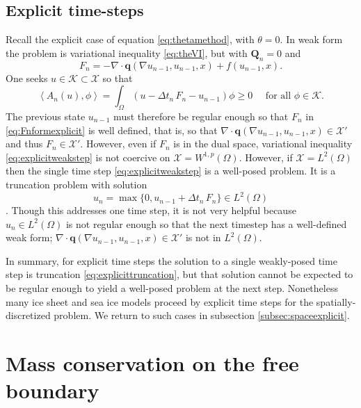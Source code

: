 \documentclass[final,onefignum]{siamart190516}
\newcommand\bq{\mathbf{q}}
\newcommand\bQ{\mathbf{Q}}
\newcommand{\Div}{\nabla\cdot}
\newcommand{\grad}{\nabla}
\newcommand{\ip}[2]{\ensuremath{\left<#1,#2\right>}}
\begin{document}
\subsection{Explicit time-steps} \label{subsec:explicit}  Recall the explicit case of equation \eqref{eq:thetamethod}, with $\theta=0$.  In weak form the problem is variational inequality \eqref{eq:theVI}, but with $\bQ_n=0$ and
\begin{equation}
F_n = - \Div \bq(\grad u_{n-1},u_{n-1},x) + f(u_{n-1},x).  \label{eq:Fnformexplicit}
\end{equation}
One seeks $u\in\mathcal{K} \subset \mathcal{X}$ so that
\begin{equation}
\ip{A_n(u)}{\phi} = \int_\Omega (u - \Delta t_n\,F_n - u_{n-1})\phi \ge 0 \quad \text{ for all } \phi \in \mathcal{K}.  \label{eq:explicitweakstep}
\end{equation}
The previous state $u_{n-1}$ must therefore be regular enough so that $F_n$ in \eqref{eq:Fnformexplicit} is well defined, that is, so that $\Div \bq(\grad u_{n-1},u_{n-1},x) \in \mathcal{X}'$ and thus $F_n\in\mathcal{X}'$.  However, even if $F_n$ is in the dual space, variational inequality \eqref{eq:explicitweakstep} is not coercive on $\mathcal{X}=W^{1,p}(\Omega)$.  However, if $\mathcal{X}=L^2(\Omega)$ then the single time step \eqref{eq:explicitweakstep} is a well-posed problem.  It is a truncation problem with solution
\begin{equation}
u_n = \max\{0,u_{n-1} + \Delta t_n\,F_n\} \in L^2(\Omega)  \label{eq:explicittruncation}
\end{equation}
\cite[page 27]{KinderlehrerStampacchia1980}.  Though this addresses one time step, it is not very helpful because $u_n \in L^2(\Omega)$ is not regular enough so that the next timestep has a well-defined weak form; $\Div \bq(\grad u_{n-1},u_{n-1},x) \in \mathcal{X}'$ is not in $L^2(\Omega)$.

In summary, for explicit time steps the solution to a single weakly-posed time step is truncation \eqref{eq:explicittruncation}, but that solution cannot be expected to be regular enough to yield a well-posed problem at the next step.  Nonetheless many ice sheet \cite{Bueleretal2005} and sea ice \cite{Thorndikeetal1975} models proceed by explicit time steps for the spatially-discretized problem.  We return to such cases in subsection \ref{subsec:spaceexplicit}.


\section{Mass conservation on the free boundary}  \label{sec:timeseries}
\end{document}
